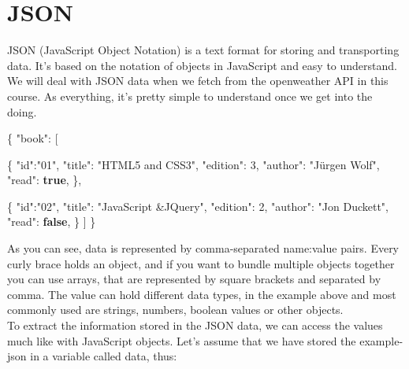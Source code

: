 \documentclass[
]{book}
\newenvironment{Shaded}{\begin{snugshade}}{\end{snugshade}}
\newcommand{\DataTypeTok}[1]{\textcolor[rgb]{0.13,0.29,0.53}{#1}}
\newcommand{\DecValTok}[1]{\textcolor[rgb]{0.00,0.00,0.81}{#1}}
\newcommand{\FunctionTok}[1]{\textcolor[rgb]{0.00,0.00,0.00}{#1}}
\newcommand{\KeywordTok}[1]{\textcolor[rgb]{0.13,0.29,0.53}{\textbf{#1}}}
\newcommand{\OtherTok}[1]{\textcolor[rgb]{0.56,0.35,0.01}{#1}}
\newcommand{\StringTok}[1]{\textcolor[rgb]{0.31,0.60,0.02}{#1}}
\begin{document}
\hypertarget{json}{%
\section{JSON}\label{json}}

JSON (JavaScript Object Notation) is a text format for storing and transporting data. It's based on the notation of objects in JavaScript and easy to understand. We will deal with JSON data when we fetch from the openweather API in this course. As everything, it's pretty simple to understand once we get into the doing.

\begin{Shaded}
\begin{Highlighting}[]
\FunctionTok{\{}
   \DataTypeTok{"book"}\FunctionTok{:} \OtherTok{[}
    
      \FunctionTok{\{}
         \DataTypeTok{"id"}\FunctionTok{:}\StringTok{"01"}\FunctionTok{,}
         \DataTypeTok{"title"}\FunctionTok{:} \StringTok{"HTML5 and CSS3"}\FunctionTok{,}
         \DataTypeTok{"edition"}\FunctionTok{:} \DecValTok{3}\FunctionTok{,}
         \DataTypeTok{"author"}\FunctionTok{:} \StringTok{"Jürgen Wolf"}\FunctionTok{,}
         \DataTypeTok{"read"}\FunctionTok{:} \KeywordTok{true}\FunctionTok{,}
      \FunctionTok{\}}\OtherTok{,}
    
      \FunctionTok{\{}
         \DataTypeTok{"id"}\FunctionTok{:}\StringTok{"02"}\FunctionTok{,}
         \DataTypeTok{"title"}\FunctionTok{:} \StringTok{"JavaScript \&JQuery"}\FunctionTok{,}
         \DataTypeTok{"edition"}\FunctionTok{:} \DecValTok{2}\FunctionTok{,}
         \DataTypeTok{"author"}\FunctionTok{:} \StringTok{"Jon Duckett"}\FunctionTok{,}
         \DataTypeTok{"read"}\FunctionTok{:} \KeywordTok{false}\FunctionTok{,}
      \FunctionTok{\}}
   \OtherTok{]}
\FunctionTok{\}}
\end{Highlighting}
\end{Shaded}

As you can see, data is represented by comma-separated name:value pairs. Every curly brace holds an object, and if you want to bundle multiple objects together you can use arrays, that are represented by square brackets and separated by comma. The value can hold different data types, in the example above and most commonly used are strings, numbers, boolean values or other objects.\\
To extract the information stored in the JSON data, we can access the values much like with JavaScript objects. Let's assume that we have stored the example-json in a variable called data, thus:
\end{document}
